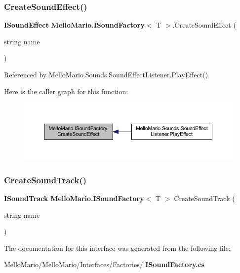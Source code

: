 \subsubsection{Create\+Sound\+Effect()}
{\footnotesize\ttfamily \textbf{ I\+Sound\+Effect} \textbf{ Mello\+Mario.\+I\+Sound\+Factory}$<$ T $>$.Create\+Sound\+Effect (\begin{DoxyParamCaption}\item[{string}]{name }\end{DoxyParamCaption})}



Referenced by Mello\+Mario.\+Sounds.\+Sound\+Effect\+Listener.\+Play\+Effect().

Here is the caller graph for this function\+:
\nopagebreak
\begin{figure}[H]
\begin{center}
\leavevmode
\includegraphics[width=350pt]{interfaceMelloMario_1_1ISoundFactory_ae0042e839d89230a68b60efa90d79e24_icgraph}
\end{center}
\end{figure}
\mbox{\label{interfaceMelloMario_1_1ISoundFactory_af47aa3e1141bf31445cf47ebc66b2cca}} 
\subsubsection{Create\+Sound\+Track()}
{\footnotesize\ttfamily \textbf{ I\+Sound\+Track} \textbf{ Mello\+Mario.\+I\+Sound\+Factory}$<$ T $>$.Create\+Sound\+Track (\begin{DoxyParamCaption}\item[{string}]{name }\end{DoxyParamCaption})}



The documentation for this interface was generated from the following file\+:\begin{DoxyCompactItemize}
\item 
Mello\+Mario/\+Mello\+Mario/\+Interfaces/\+Factories/\textbf{ I\+Sound\+Factory.\+cs}\end{DoxyCompactItemize}
